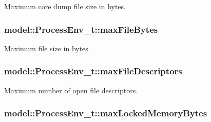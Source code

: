 Maximum core dump file size in bytes. 

\subsubsection[{\texorpdfstring{max\+File\+Bytes}{maxFileBytes}}]{ model\+::\+Process\+Env\+\_\+t\+::max\+File\+Bytes}\hypertarget{structmodel_1_1_process_env__t_a11139dc4c175dc5e1c2cf91a7a248949}{}\label{structmodel_1_1_process_env__t_a11139dc4c175dc5e1c2cf91a7a248949}


Maximum file size in bytes. 

\subsubsection[{\texorpdfstring{max\+File\+Descriptors}{maxFileDescriptors}}]{ model\+::\+Process\+Env\+\_\+t\+::max\+File\+Descriptors}\hypertarget{structmodel_1_1_process_env__t_aacbd1640bb653bcba809294c88f0884e}{}\label{structmodel_1_1_process_env__t_aacbd1640bb653bcba809294c88f0884e}


Maximum number of open file descriptors. 

\subsubsection[{\texorpdfstring{max\+Locked\+Memory\+Bytes}{maxLockedMemoryBytes}}]{ model\+::\+Process\+Env\+\_\+t\+::max\+Locked\+Memory\+Bytes}\hypertarget{structmodel_1_1_process_env__t_af7dc3709b231cd34a1a066bff64b296c}{}\label{structmodel_1_1_process_env__t_af7dc3709b231cd34a1a066bff64b296c}


